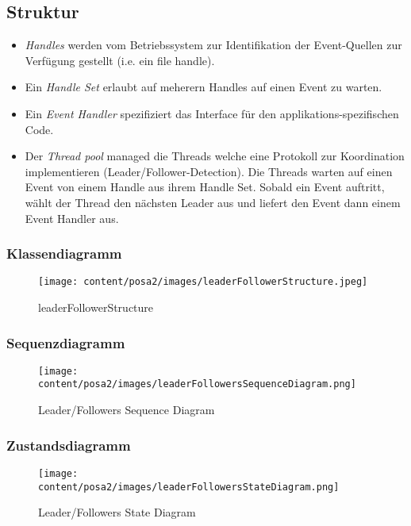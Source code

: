 \subsection{Struktur}

\begin{itemize}
	\item \emph{Handles} werden vom Betriebssystem zur Identifikation der Event-Quellen zur Verfügung gestellt (i.e. ein file handle).
	\item Ein \emph{Handle Set} erlaubt auf meherern Handles auf einen Event zu warten.
	\item Ein \emph{Event Handler} spezifiziert das Interface für den applikations-spezifischen Code.
	\item Der \emph{Thread pool} managed die Threads welche eine Protokoll zur Koordination implementieren (Leader/Follower-Detection). Die Threads warten auf einen Event von einem Handle aus ihrem Handle Set. Sobald ein Event auftritt, wählt der Thread den nächsten Leader aus und liefert den Event dann einem Event Handler aus.
\end{itemize}

\subsubsection*{Klassendiagramm}

\begin{figure}[H]
	\centering
	\texttt{[image: content/posa2/images/leaderFollowerStructure.jpeg]}
	\caption{leaderFollowerStructure}
\end{figure}


\subsubsection*{Sequenzdiagramm}


\begin{figure}[H]
	\centering
	\texttt{[image: content/posa2/images/leaderFollowersSequenceDiagram.png]}
	\caption{Leader/Followers Sequence Diagram}
\end{figure}


\subsubsection*{Zustandsdiagramm}


\begin{figure}[H]
	\centering
	\texttt{[image: content/posa2/images/leaderFollowersStateDiagram.png]}
	\caption{Leader/Followers State Diagram}
\end{figure}


